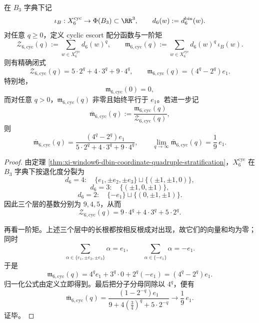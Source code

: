 \begin{theorem}\label{thm:conclusion-window6-cyclic-escort-first-moment}
在 \(B_3\) 字典下记
\[
\iota_B:X_6^{\mathrm{cyc}}\to \Phi(B_3)\subset \RR^3,
\qquad
d_6(w):=d_6^{\mathrm{bin}}(w).
\]
对任意 \(q\ge 0\)，定义 cyclic escort 配分函数与一阶矩
\[
\mathcal Z_{6,\mathrm{cyc}}(q)
:=
\sum_{w\in X_6^{\mathrm{cyc}}} d_6(w)^q,
\qquad
\mathfrak m_{6,\mathrm{cyc}}(q)
:=
\sum_{w\in X_6^{\mathrm{cyc}}} d_6(w)^q\,\iota_B(w).
\]
则有精确闭式
\[
\mathcal Z_{6,\mathrm{cyc}}(q)=5\cdot 2^q+4\cdot 3^q+9\cdot 4^q,
\qquad
\mathfrak m_{6,\mathrm{cyc}}(q)=(4^q-2^q)e_1.
\]
特别地，
\[
\mathfrak m_{6,\mathrm{cyc}}(0)=0,
\]
而对任意 \(q>0\)，\(\mathfrak m_{6,\mathrm{cyc}}(q)\) 非零且始终平行于 \(e_1\)。若进一步记
\[
\overline{\mathfrak m}_{6,\mathrm{cyc}}(q)
:=
\frac{\mathfrak m_{6,\mathrm{cyc}}(q)}{\mathcal Z_{6,\mathrm{cyc}}(q)},
\]
则
\[
\overline{\mathfrak m}_{6,\mathrm{cyc}}(q)
=
\frac{(4^q-2^q)e_1}{5\cdot 2^q+4\cdot 3^q+9\cdot 4^q},
\qquad
\lim_{q\to\infty}\overline{\mathfrak m}_{6,\mathrm{cyc}}(q)=\frac19\,e_1.
\]
\end{theorem}
\begin{proof}
由定理 \ref{thm:xi-window6-dbin-coordinate-quadruple-stratification}，\(X_6^{\mathrm{cyc}}\) 在 \(B_3\) 字典下按退化度分裂为
\[
d_6=4:\quad \{e_1,\pm e_2,\pm e_3\}\sqcup\{(\pm1,\pm1,0)\},
\]
\[
d_6=3:\quad \{(\pm1,0,\pm1)\},
\]
\[
d_6=2:\quad \{-e_1\}\sqcup\{(0,\pm1,\pm1)\}.
\]
因此三个层的基数分别为 \(9,4,5\)，从而
\[
\mathcal Z_{6,\mathrm{cyc}}(q)=9\cdot 4^q+4\cdot 3^q+5\cdot 2^q.
\]

再看一阶矩。上述三个层中的长根都按相反根成对出现，故它们的向量和均为零；同时
\[
\sum_{\alpha\in\{e_1,\pm e_2,\pm e_3\}}\alpha=e_1,
\qquad
\sum_{\alpha\in\{-e_1\}}\alpha=-e_1.
\]
于是
\[
\mathfrak m_{6,\mathrm{cyc}}(q)
=
4^q e_1+3^q\cdot 0+2^q(-e_1)
=(4^q-2^q)e_1.
\]
归一化公式由定义立即得到。最后把分子分母同除以 \(4^q\)，便有
\[
\overline{\mathfrak m}_{6,\mathrm{cyc}}(q)
=
\frac{(1-2^{-q})e_1}{9+4\left(\frac34\right)^q+5\cdot 2^{-q}}
\longrightarrow \frac19\,e_1.
\]
证毕。
\end{proof}

